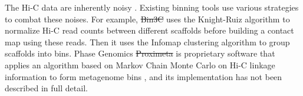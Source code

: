 \documentclass[fleqn,10pt,lineno]{wlpeerj}
\providecommand{\DIFaddtex}[1]{{\protect\color{blue}\uwave{#1}}} %
\providecommand{\DIFdeltex}[1]{{\protect\color{red}\sout{#1}}}                      %
\providecommand{\DIFaddbegin}{} %
\providecommand{\DIFaddend}{} %
\providecommand{\DIFdelbegin}{} %
\providecommand{\DIFdelend}{} %
\providecommand{\DIFadd}[1]{\texorpdfstring{\DIFaddtex{#1}}{#1}} %
\providecommand{\DIFdel}[1]{\texorpdfstring{\DIFdeltex{#1}}{}} %
\newcommand{\DIFscaledelfig}{0.5}
\newlength{\DIFdelgraphicswidth} %
\newlength{\DIFdelgraphicsheight} %
\newcommand{\DIFaddincludegraphics}[2][]{{\color{blue}\fbox{\DIFOincludegraphics[#1]{#2}}}} %
\newcommand{\DIFdelincludegraphics}[2][]{%
\sbox{\DIFdelgraphicsbox}{\DIFOincludegraphics[#1]{#2}}%
\settoboxwidth{\DIFdelgraphicswidth}{\DIFdelgraphicsbox} %
\settoboxtotalheight{\DIFdelgraphicsheight}{\DIFdelgraphicsbox} %
\scalebox{\DIFscaledelfig}{%
\parbox[b]{\DIFdelgraphicswidth}{\usebox{\DIFdelgraphicsbox}\\[-\baselineskip] \rule{\DIFdelgraphicswidth}{0em}}\llap{\resizebox{\DIFdelgraphicswidth}{\DIFdelgraphicsheight}{%
\setlength{\unitlength}{\DIFdelgraphicswidth}%
\begin{picture}(1,1)%
\thicklines\linethickness{2pt} %
{\color[rgb]{1,0,0}\put(0,0){\framebox(1,1){}}}%
{\color[rgb]{1,0,0}\put(0,0){\line( 1,1){1}}}%
{\color[rgb]{1,0,0}\put(0,1){\line(1,-1){1}}}%
\end{picture}%
}\hspace*{3pt}}} %
} %
\DeclareRobustCommand{\DIFaddbegin}{\DIFOaddbegin \let\includegraphics\DIFaddincludegraphics} %
\DeclareRobustCommand{\DIFaddend}{\DIFOaddend \let\includegraphics\DIFOincludegraphics} %
\DeclareRobustCommand{\DIFdelbegin}{\DIFOdelbegin \let\includegraphics\DIFdelincludegraphics} %
\DeclareRobustCommand{\DIFdelend}{\DIFOaddend \let\includegraphics\DIFOincludegraphics} %
\begin{document}
The Hi-C data are inherently noisy \citep{Yaffe2011ProbabilisticMO}. Existing binning tools use various strategies to combat these noises. For example, \DIFdelbegin \DIFdel{Bin3C }\DIFdelend \DIFaddbegin \DIFadd{bin3C }\DIFaddend uses the Knight-Ruiz algorithm to normalize Hi-C read counts between different scaffolds before building a contact map using these reads. Then it uses the Infomap clustering algorithm to group scaffolds into bins\citep{demaere2019bin3c}.  Phase Genomics \DIFdelbegin \DIFdel{Proximeta }\DIFdelend \DIFaddbegin \DIFadd{ProxiMeta }\DIFaddend is proprietary software that applies an algorithm based on Markov Chain Monte Carlo on Hi-C linkage information to form metagenome bins \citep{press2017hi}, and its implementation has not been described in full detail.\DIFaddbegin {}
\DIFaddend 
\end{document}
